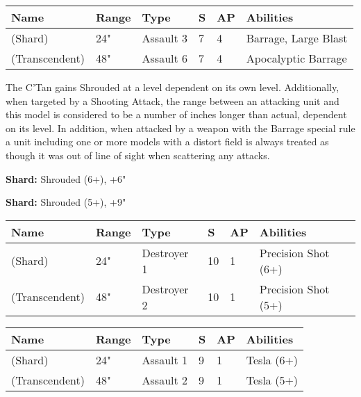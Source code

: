  \label{Sky of Falling Stars}

\noindent
\begin{tabular}{||m{160pt} m{31pt} m{55pt} m{12pt} m{12pt} m{200pt}||}
	\hline
	Name & Range & Type & S & AP & Abilities \\
	\hline
	\quickref{Sky of Falling Stars} (Shard) & 24" & Assault 3 & 7 & 4 & Barrage, Large Blast \\
	\quickref{Sky of Falling Stars} (Transcendent) & 48" & Assault 6 & 7 & 4 & Apocalyptic Barrage \\
	\hline
\end{tabular}

 \label{Swarm of Spirit Dust}

The C'Tan gains Shrouded at a level dependent on its own level. Additionally, when targeted by a Shooting Attack, the range between an attacking unit and this model is considered to be a number of inches longer than actual, dependent on its level. In addition, when attacked by a weapon with the Barrage special rule a unit including one or more models with a distort field is always treated as though it was out of line of sight when scattering any attacks.

\textbf{Shard:} Shrouded (6+), +6"

\textbf{Shard:} Shrouded (5+), +9"

 \label{Time's Arrow}

\noindent
\begin{tabular}{||m{160pt} m{31pt} m{55pt} m{12pt} m{12pt} m{200pt}||}
	\hline
	Name & Range & Type & S & AP & Abilities \\
	\hline
	\quickref{Time's Arrow} (Shard) & 24" & Destroyer 1 & 10 & 1 & Precision Shot (6+) \\
	\quickref{Time's Arrow} (Transcendent) & 48" & Destroyer 2 & 10 & 1 & Precision Shot (5+) \\
	\hline
\end{tabular}

 \label{Transdimensional Thunderbolt}

\noindent
\begin{tabular}{||m{160pt} m{31pt} m{55pt} m{12pt} m{12pt} m{200pt}||}
	\hline
	Name & Range & Type & S & AP & Abilities \\
	\hline
	\quickref{Transdimensional Thunderbolt} (Shard) & 24" & Assault 1 & 9 & 1 & Tesla (6+) \\
	\quickref{Transdimensional Thunderbolt} (Transcendent) & 48" & Assault 2 & 9 & 1 & Tesla (5+) \\
	\hline
\end{tabular}

